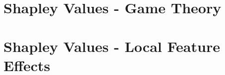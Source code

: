 \documentclass[11pt,compress,t,n
otes=noshow, aspectratio=169, xcolor=table]{beamer}
\begin{document}



\section{Shapley Values - Game Theory}


\section{Shapley Values - Local Feature Effects}

\end{document}
